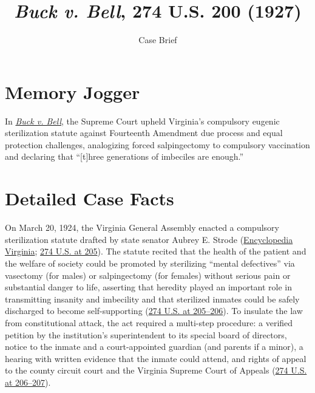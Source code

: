 \documentclass[12pt]{article}
\title{\textit{Buck v. Bell}, 274 U.S. 200 (1927)}
\subtitle{Case Brief}
\author{}
\date{}
\begin{document}
\maketitle

\section{Memory Jogger}

In \href{https://www.courtlistener.com/opinion/101076/buck-v-bell/}{\textit{Buck v. Bell}}, the Supreme Court upheld Virginia's compulsory eugenic sterilization statute against Fourteenth Amendment due process and equal protection challenges, analogizing forced salpingectomy to compulsory vaccination and declaring that ``[t]hree generations of imbeciles are enough.''

\section{Detailed Case Facts}

On March 20, 1924, the Virginia General Assembly enacted a compulsory sterilization statute drafted by state senator Aubrey E. Strode (\href{https://encyclopediavirginia.org/entries/buck-v-bell-1927/}{Encyclopedia Virginia}; \href{https://supreme.justia.com/cases/federal/us/274/200/}{274 U.S. at 205}). The statute recited that the health of the patient and the welfare of society could be promoted by sterilizing ``mental defectives'' via vasectomy (for males) or salpingectomy (for females) without serious pain or substantial danger to life, asserting that heredity played an important role in transmitting insanity and imbecility and that sterilized inmates could be safely discharged to become self-supporting (\href{https://supreme.justia.com/cases/federal/us/274/200/}{274 U.S. at 205--206}). To insulate the law from constitutional attack, the act required a multi-step procedure: a verified petition by the institution's superintendent to its special board of directors, notice to the inmate and a court-appointed guardian (and parents if a minor), a hearing with written evidence that the inmate could attend, and rights of appeal to the county circuit court and the Virginia Supreme Court of Appeals (\href{https://supreme.justia.com/cases/federal/us/274/200/}{274 U.S. at 206--207}).
\end{document}
